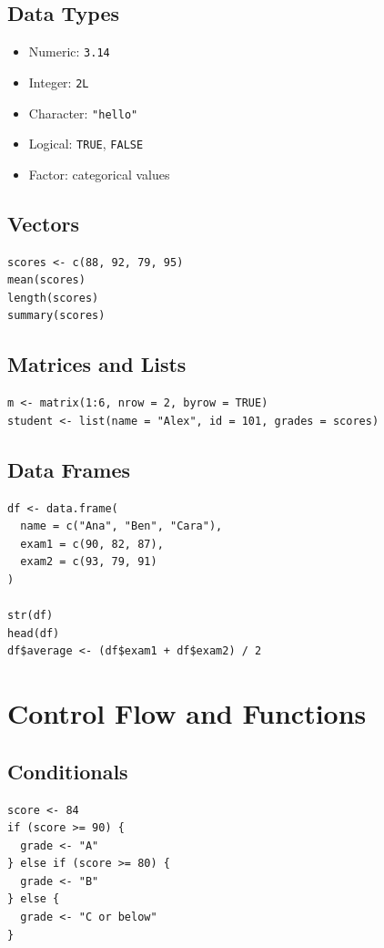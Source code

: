 \documentclass[11pt]{article}
\begin{document}
\subsection{Data Types}
\begin{itemize}[leftmargin=*]
  \item Numeric: \texttt{3.14}
  \item Integer: \texttt{2L}
  \item Character: \texttt{"hello"}
  \item Logical: \texttt{TRUE}, \texttt{FALSE}
  \item Factor: categorical values
\end{itemize}

\subsection{Vectors}
\begin{verbatim}
scores <- c(88, 92, 79, 95)
mean(scores)
length(scores)
summary(scores)
\end{verbatim}

\subsection{Matrices and Lists}
\begin{verbatim}
m <- matrix(1:6, nrow = 2, byrow = TRUE)
student <- list(name = "Alex", id = 101, grades = scores)
\end{verbatim}

\subsection{Data Frames}
\begin{verbatim}
df <- data.frame(
  name = c("Ana", "Ben", "Cara"),
  exam1 = c(90, 82, 87),
  exam2 = c(93, 79, 91)
)

str(df)
head(df)
df$average <- (df$exam1 + df$exam2) / 2
\end{verbatim}

\section{Control Flow and Functions}
\subsection{Conditionals}
\begin{verbatim}
score <- 84
if (score >= 90) {
  grade <- "A"
} else if (score >= 80) {
  grade <- "B"
} else {
  grade <- "C or below"
}
\end{verbatim}
\end{document}
